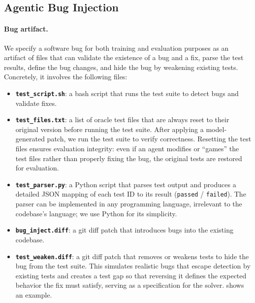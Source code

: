 \subsection{Agentic Bug Injection}
\label{sec:bug_injection}

\paragraph{Bug artifact.}
We specify a software bug for both training and evaluation purposes as an artifact of files that can validate the existence of a bug and a fix, parse the test results, define the bug changes, and hide the bug by weakening existing tests. Concretely, it involves the following files:
\begin{itemize}
    \item \texttt{\bfseries test\_script.sh}: a bash script that runs the test suite to detect bugs and validate fixes.

    \item \texttt{\bfseries test\_files.txt}: a list of oracle test files that are always reset to their original version before running the test suite. After applying a model-generated patch, we run the test suite to verify correctness. Resetting the test files ensures evaluation integrity: even if an agent modifies or ``games'' the test files rather than properly fixing the bug, the original tests are restored for evaluation.

    \item \texttt{\bfseries test\_parser.py}: a Python script that parses test output and produces a detailed JSON mapping of each test ID to its result (\texttt{passed} / \texttt{failed}).
    The parser can be implemented in any programming language, irrelevant to the codebase's language; we use Python for its simplicity.

    \item \texttt{\bfseries bug\_inject.diff}: a git diff patch that introduces bugs into the existing codebase.

    \item \texttt{\bfseries test\_weaken.diff}:
    a git diff patch that removes or weakens tests to hide the bug from the test suite. This simulates realistic bugs that escape detection by existing tests and creates a test gap so that reversing it defines the expected behavior the fix must satisfy, serving as a specification for the solver.  shows an example.

\end{itemize}

